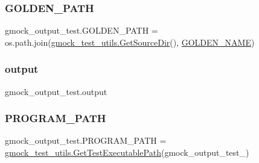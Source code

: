 \mbox{\label{namespacegmock__output__test_a632c0fbf08500e4ed3c0e33f5e2ac771}} 
\subsubsection{\texorpdfstring{GOLDEN\_PATH}{GOLDEN\_PATH}}
{\footnotesize\ttfamily gmock\+\_\+output\+\_\+test.\+G\+O\+L\+D\+E\+N\+\_\+\+P\+A\+TH = os.\+path.\+join(\mbox{\hyperlink{namespacegmock__test__utils_ab7217591e655e80392c9db6b99d04765}{gmock\+\_\+test\+\_\+utils.\+Get\+Source\+Dir}}(), \mbox{\hyperlink{namespacegmock__output__test_ac6e9298ea3967e6fa704c9c246d6cc18}{G\+O\+L\+D\+E\+N\+\_\+\+N\+A\+ME}})}

\mbox{\label{namespacegmock__output__test_a4277f8598ba3835393fe82e82d09375d}} 
\subsubsection{\texorpdfstring{output}{output}}
{\footnotesize\ttfamily gmock\+\_\+output\+\_\+test.\+output}

\mbox{\label{namespacegmock__output__test_a03aac0fac952a0b3648340f529af7f59}} 
\subsubsection{\texorpdfstring{PROGRAM\_PATH}{PROGRAM\_PATH}}
{\footnotesize\ttfamily gmock\+\_\+output\+\_\+test.\+P\+R\+O\+G\+R\+A\+M\+\_\+\+P\+A\+TH = \mbox{\hyperlink{namespacegmock__test__utils_aadd2927024e24f0c53f7ba283402cdb1}{gmock\+\_\+test\+\_\+utils.\+Get\+Test\+Executable\+Path}}(\textquotesingle{}gmock\+\_\+output\+\_\+test\+\_\+\textquotesingle{})}

